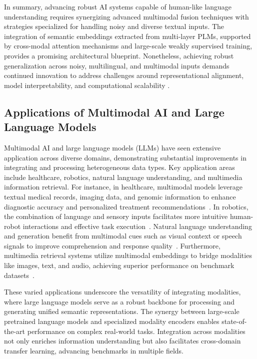 \documentclass[sigconf]{acmart}
\begin{document}
In summary, advancing robust AI systems capable of human-like language understanding requires synergizing advanced multimodal fusion techniques with strategies specialized for handling noisy and diverse textual inputs. The integration of semantic embeddings extracted from multi-layer PLMs, supported by cross-modal attention mechanisms and large-scale weakly supervised training, provides a promising architectural blueprint. Nonetheless, achieving robust generalization across noisy, multilingual, and multimodal inputs demands continued innovation to address challenges around representational alignment, model interpretability, and computational scalability \cite{ref1,ref2,ref3,ref4,ref5,ref6,ref7,ref12,ref28,ref31,ref32,ref37,ref38}.

\subsection{Applications of Multimodal AI and Large Language Models}

Multimodal AI and large language models (LLMs) have seen extensive application across diverse domains, demonstrating substantial improvements in integrating and processing heterogeneous data types. Key application areas include healthcare, robotics, natural language understanding, and multimedia information retrieval. For instance, in healthcare, multimodal models leverage textual medical records, imaging data, and genomic information to enhance diagnostic accuracy and personalized treatment recommendations~\cite{}. In robotics, the combination of language and sensory inputs facilitates more intuitive human-robot interactions and effective task execution~\cite{}. Natural language understanding and generation benefit from multimodal cues such as visual context or speech signals to improve comprehension and response quality~\cite{}. Furthermore, multimedia retrieval systems utilize multimodal embeddings to bridge modalities like images, text, and audio, achieving superior performance on benchmark datasets~\cite{}.

These varied applications underscore the versatility of integrating modalities, where large language models serve as a robust backbone for processing and generating unified semantic representations. The synergy between large-scale pretrained language models and specialized modality encoders enables state-of-the-art performance on complex real-world tasks. Integration across modalities not only enriches information understanding but also facilitates cross-domain transfer learning, advancing benchmarks in multiple fields.
\end{document}
